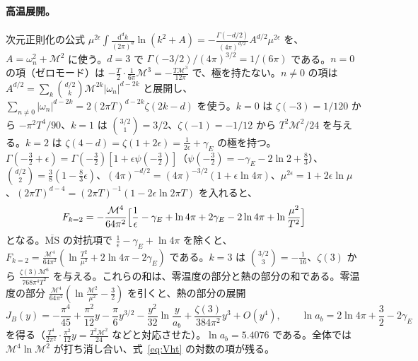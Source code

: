 \documentclass[a4paper,10pt]{ltjsarticle}
\newcommand{\dd}{\mathrm{d}}
\begin{document}
\paragraph{高温展開。}次元正則化の公式 $\mu^{2\epsilon}\int\frac{\dd^dk}{(2\pi)^d}\ln(k^2+A)=-\frac{\Gamma(-d/2)}{(4\pi)^{d/2}}A^{d/2}\mu^{2\epsilon}$ を、$A=\omega_n^2+\mathcal M^2$ に使う。$d=3$ で $\Gamma(-3/2)/(4\pi)^{3/2}=1/(6\pi)$ である。$n=0$ の項（ゼロモード）は $-\frac T2\cdot\frac1{6\pi}\mathcal M^3=-\frac{T\mathcal M^3}{12\pi}$ で、極を持たない。$n\ne0$ の項は $A^{d/2}=\sum_k\binom{d/2}{k}\mathcal M^{2k}|\omega_n|^{d-2k}$ と展開し、$\sum_{n\ne0}|\omega_n|^{d-2k}=2(2\pi T)^{d-2k}\zeta(2k-d)$ を使う。$k=0$ は $\zeta(-3)=1/120$ から $-\pi^2T^4/90$、$k=1$ は $\binom{3/2}{1}=3/2$、$\zeta(-1)=-1/12$ から $T^2\mathcal M^2/24$ を与える。$k=2$ は $\zeta(4-d)=\zeta(1+2\epsilon)=\frac1{2\epsilon}+\gamma_E$ の極を持つ。$\Gamma(-\frac32+\epsilon)=\Gamma(-\frac32)[1+\epsilon\psi(-\frac32)]$（$\psi(-\frac32)=-\gamma_E-2\ln2+\frac83$）、$\binom{d/2}{2}=\frac38(1-\frac83\epsilon)$、$(4\pi)^{-d/2}=(4\pi)^{-3/2}(1+\epsilon\ln4\pi)$、$\mu^{2\epsilon}=1+2\epsilon\ln\mu$、$(2\pi T)^{d-4}=(2\pi T)^{-1}(1-2\epsilon\ln2\pi T)$ を入れると、
\begin{equation*}
F_{k=2}=-\frac{\mathcal M^4}{64\pi^2}\Bigl[\frac1\epsilon-\gamma_E+\ln4\pi+2\gamma_E-2\ln4\pi+\ln\frac{\mu^2}{T^2}\Bigr]
\end{equation*}
となる。$\overline{\mathrm{MS}}$ の対抗項で $\frac1\epsilon-\gamma_E+\ln4\pi$ を除くと、$F_{k=2}=\frac{\mathcal M^4}{64\pi^2}(\ln\frac{T^2}{\mu^2}+2\ln4\pi-2\gamma_E)$ である。$k=3$ は $\binom{3/2}{3}=-\frac1{16}$、$\zeta(3)$ から $\frac{\zeta(3)\mathcal M^6}{768\pi^4T^2}$ を与える。これらの和は、零温度の部分と熱の部分の和である。零温度の部分 $\frac{\mathcal M^4}{64\pi^2}(\ln\frac{\mathcal M^2}{\mu^2}-\frac32)$ を引くと、熱の部分の展開
\begin{equation*}
J_B(y)=-\frac{\pi^4}{45}+\frac{\pi^2}{12}y-\frac\pi6y^{3/2}-\frac{y^2}{32}\ln\frac y{a_b}+\frac{\zeta(3)}{384\pi^2}y^3+O(y^4),\qquad \ln a_b=2\ln4\pi+\frac32-2\gamma_E
\end{equation*}
を得る（$\frac{T^4}{2\pi^2}\cdot\frac{\pi^2}{12}y=\frac{T^2\mathcal M^2}{24}$ などと対応させた）。$\ln a_b=5.4076$ である。全体では $\mathcal M^4\ln\mathcal M^2$ が打ち消し合い、式~\eqref{eq:Vht} の対数の項が残る。
\end{document}
